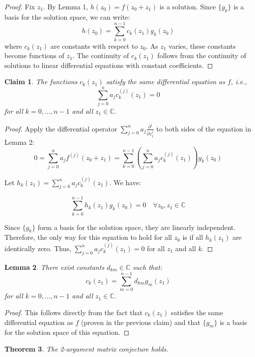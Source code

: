 \documentclass{article}
\newtheorem{theorem}{Theorem}
\newtheorem{lemma}[theorem]{Lemma}
\newtheorem{claim}[theorem]{Claim}
\begin{document}
\begin{proof}
Fix $z_1$. By Lemma 1, $h(z_0) = f(z_0 + z_1)$ is a solution. Since $\{g_k\}$ is a basis for the solution space, we can write:
\[
h(z_0) = \sum_{k=0}^{n-1} c_k(z_1) g_k(z_0)
\]
where $c_k(z_1)$ are constants with respect to $z_0$. As $z_1$ varies, these constants become functions of $z_1$. The continuity of $c_k(z_1)$ follows from the continuity of solutions to linear differential equations with constant coefficients.
\end{proof}

\begin{claim}
The functions $c_k(z_1)$ satisfy the same differential equation as $f$, i.e.,
\[
\sum_{j=0}^n a_j c_k^{(j)}(z_1) = 0
\]
for all $k = 0, \ldots, n-1$ and all $z_1 \in \mathbb{C}$.
\end{claim}

\begin{proof}
Apply the differential operator $\sum_{j=0}^n a_j \frac{\partial^j}{\partial z_1^j}$ to both sides of the equation in Lemma 2:
\[
0 = \sum_{j=0}^n a_j f^{(j)}(z_0 + z_1) = \sum_{k=0}^{n-1} \left(\sum_{j=0}^n a_j c_k^{(j)}(z_1)\right) g_k(z_0)
\]

Let $h_k(z_1) = \sum_{j=0}^n a_j c_k^{(j)}(z_1)$. We have:

\[
\sum_{k=0}^{n-1} h_k(z_1) g_k(z_0) = 0 \quad \forall z_0, z_1 \in \mathbb{C}
\]

Since $\{g_k\}$ form a basis for the solution space, they are linearly independent. Therefore, the only way for this equation to hold for all $z_0$ is if all $h_k(z_1)$ are identically zero. Thus, $\sum_{j=0}^n a_j c_k^{(j)}(z_1) = 0$ for all $z_1$ and all $k$.
\end{proof}

\begin{lemma}
There exist constants $d_{km} \in \mathbb{C}$ such that:
\[
c_k(z_1) = \sum_{m=0}^{n-1} d_{km} g_m(z_1)
\]
for all $k = 0, \ldots, n-1$ and all $z_1 \in \mathbb{C}$.
\end{lemma}

\begin{proof}
This follows directly from the fact that $c_k(z_1)$ satisfies the same differential equation as $f$ (proven in the previous claim) and that $\{g_m\}$ is a basis for the solution space of this equation.
\end{proof}

\begin{theorem}
The 2-argument matrix conjecture holds.
\end{theorem}
\end{document}

